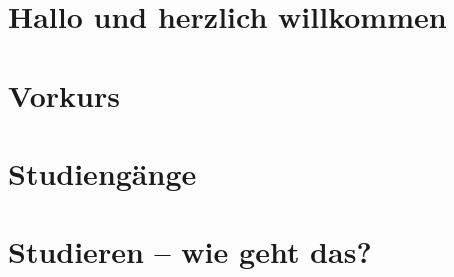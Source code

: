 \documentclass[ngerman,a4paper,openany,twocolumn,showtrims]{memoir}
\begin{document}
\pagestyle{empty}

\frontmatter

\tableofcontents

\mainmatter
\pagestyle{plain}
\renewcommand*{\chaptermark}[1]{%
	\markboth{%
		\textcolor{sectiontextfarbe}{%
			\sffamily\bfseries\textsc{#1}%
		}%
	}{}%
}
\renewcommand*{\sectionmark}[1]{%
	\markright{%
		\textcolor{sectiontextfarbe}{%
			\sffamily\bfseries\textsc{#1}%
		}%
	}%
}

\chapter{Hallo und herzlich willkommen}


\chapter{Vorkurs}





\chapter{Studiengänge} 










\chapter{Studieren -- wie geht das?}











\end{document}
